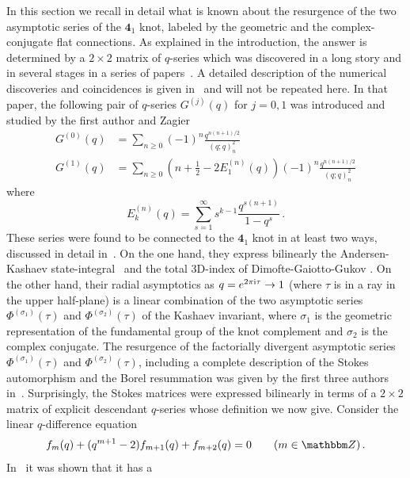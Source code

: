 \documentclass[12pt,reqno]{amsart}
\theoremstyle{definition}
\def\BZ{\mathbbm Z}
\def\s{\sigma}
\def\be{\begin{equation}}
\def\ee{\end{equation}}
\def\ri{\mathrm{i}}
\def\ri{{\rm i}}
\def\md{\mathbf}
\newcommand{\knot}[1]{\md{#1}}
\begin{document}
In this section we recall in detail what is known about the resurgence
of the two asymptotic series of the $\knot{4}_1$ knot, labeled by the
geometric and the complex-conjugate flat connections. As explained in
the introduction, the answer is determined by a $2 \times 2$ matrix of
$q$-series which was discovered in a long story and in several stages
in a series of papers~\cite{GZ:qseries,
  GK:qseries,GGM:resurgent,GGM:peacock}. A detailed description of the
numerical discoveries and coincidences is given in~\cite{GZ:qseries}
and will not be repeated here. In that paper, the following pair of
$q$-series $G^{(j)}(q)$ for $j=0,1$ was introduced and studied by the
first author and Zagier~\cite{GZ:qseries}
\begin{equation}
\label{G01}
\begin{aligned}
G^{(0)}(q) &=
\sum_{n\geq0}(-1)^{n}\frac{q^{n(n+1)/2}}{(q;q)_{n}^{2}} \\
G^{(1)}(q) &=
\sum_{n\geq0}\left(n+\frac{1}{2}-2E_{1}^{(n)}(q)\right)(-1)^{n}
\frac{q^{n(n+1)/2}}{(q;q)_{n}^{2}} 
\end{aligned}
\end{equation}
where
\be
\label{Ek}
E_{k}^{(n)}(q) = \sum_{s=1}^{\infty}s^{k-1}\frac{q^{s(n+1)}}{1-q^{s}} \,.
\ee
These series were found to be connected to the $\knot{4}_1$ knot in at least two ways,
discussed in detail in~\cite{GZ:qseries}. On the one hand, they express
bilinearly the Andersen-Kashaev state-integral~\cite{GK:qseries} and the total
3D-index of Dimofte-Gaiotto-Gukov \cite{DGG2}. On the other hand, their radial
asymptotics as $q=e^{2\pi \ri \tau} \to 1$ (where $\tau$ is in a ray in the upper
half-plane)
is a linear combination of the two asymptotic series $\Phi^{(\s_1)}(\tau)$ and
$\Phi^{(\s_2)}(\tau)$ of the Kashaev invariant, where $\s_1$ is the geometric
representation of the fundamental group of the knot complement and $\s_2$ is
the complex conjugate. The resurgence of the factorially divergent
asymptotic series $\Phi^{(\s_1)}(\tau)$ and $\Phi^{(\s_2)}(\tau)$, including
a complete description of the Stokes automorphism and the Borel
resummation was given by the first three authors in~\cite{GGM:resurgent}. Surprisingly,
the Stokes matrices were expressed bilinearly in terms of a $2 \times 2$ matrix
of explicit descendant $q$-series whose definition we now give.
Consider the linear $q$-difference equation
\be
\label{41rec}
f_m(q) + (q^{m+1}-2) f_{m+1}(q) + f_{m+2}(q) = 0 \qquad (m \in \BZ) \,.
\ee
In~\cite{GGM:resurgent} it was shown that it has a
\end{document}
